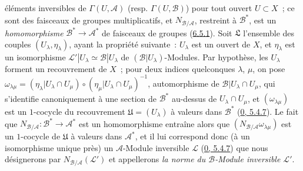 
éléments inversibles de $\Gamma(U,\mathcal{A})$ (resp.
$\Gamma(U,\mathcal{B})$) pour tout ouvert $U\subset X$~; ce sont des faisceaux
de groupes multiplicatifs, et $N_{\mathcal{B}/\mathcal{A}}$, restreint à
$\mathcal{B}^*$, est un \emph{homomorphisme}
$\mathcal{B}^*\to\mathcal{A}^*$ de faisceaux de groupes
(\hyperref[II.6.5.1-fr]{6.5.1}). Soit $\mathfrak{L}$ l'ensemble des couples
$(U_\lambda,\eta_\lambda)$, ayant la propriété suivante~: $U_\lambda$ est un
ouvert de $X$, et $\eta_\lambda$ est un isomorphisme
$\mathcal{L}'|U_\lambda\simeq\mathcal{B}|U_\lambda$ de
$(\mathcal{B}|U_\lambda)$-Modules. Par hypothèse, les $U_\lambda$ forment un
recouvrement de $X$~; pour deux indices quelconques $\lambda$, $\mu$, on pose
$\omega_{\lambda\mu}=(\eta_\lambda|U_\lambda\cap U_\mu)
\circ(\eta_\mu|U_\lambda\cap U_\mu)^{-1}$, automorphisme de
$\mathcal{B}|U_\lambda\cap U_\mu$, qui s'identifie canoniquement à une section
de $\mathcal{B}^*$ au-dessus de $U_\lambda\cap U_\mu$, et
$(\omega_{\lambda\mu})$ est un $1$-cocycle du recouvrement
$\mathfrak{U}=(U_\lambda)$ à valeurs dans $\mathcal{B}^*$
(\hyperref[0.5.4.7-fr]{0, 5.4.7}). Le fait que
$N_{\mathcal{B}/\mathcal{A}}:\mathcal{B}^*\to\mathcal{A}^*$ est un
homomorphisme entraîne alors que
$(N_{\mathcal{B}/\mathcal{A}}\omega_{\lambda\mu})$ est un $1$-cocycle de
$\mathfrak{U}$ à valeurs dans $\mathcal{A}^*$, et il lui correspond donc (à un
isomorphisme unique près) un $\mathcal{A}$-Module inversible $\mathcal{L}$
(\hyperref[0.5.4.7-fr]{0, 5.4.7}) que nous désignerons par
$N_{\mathcal{B}/\mathcal{A}}(\mathcal{L}')$ et appellerons \emph{la norme du
$\mathcal{B}$-Module inversible $\mathcal{L}'$}.

